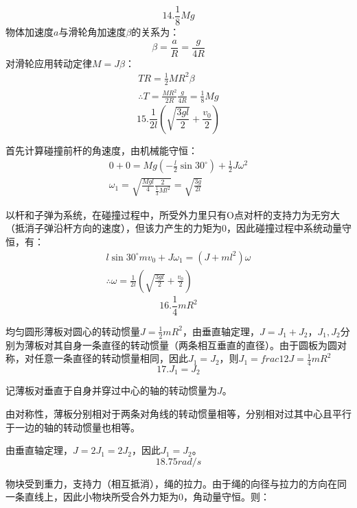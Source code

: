 \documentclass[b5paper,opensource]{./template/qyxf-book}
\begin{document}
		\[14.\frac{1}{8}Mg\]
		物体加速度$ a $与滑轮角加速度$ \beta $的关系为：
		\[\beta=\frac{a}{R}=\frac{g}{4R}\]
		对滑轮应用转动定律$M=J\beta$：
		\begin{gather*}
		TR=\frac{1}{2}MR^2\beta\\
		\therefore T=\frac{MR^2}{2R}\frac{g}{4R}=\frac{1}{8}Mg
		\end{gather*}
		\[15.\frac{1}{2l}\left(\sqrt{\frac{3gl}{2}}+\frac{v_0}{2}\right)\]\par
		首先计算碰撞前杆的角速度，由机械能守恒：
		\begin{gather*}
		0+0=Mg(-\frac{l}{2}\sin 30^\circ)+\frac{1}{2}J\omega^2\\
		\omega_1=\sqrt{\frac{Mgl}{4}\frac{2}{\frac{1}{3}Ml^2}}=\sqrt{\frac{3g}{2l}}
		\end{gather*}\par
		以杆和子弹为系统，在碰撞过程中，所受外力里只有O点对杆的支持力为无穷大（抵消子弹沿杆方向的速度），但该力产生的力矩为0，因此碰撞过程中系统动量守恒，有：
		\begin{gather*}
		l\sin 30^\circ mv_0+J\omega_1=(J+ml^2)\omega\\
		\therefore \omega=\frac{1}{2l}\left(\sqrt{\frac{3gl}{2}}+\frac{v_0}{2}\right)
		\end{gather*}
		\[16.\frac{1}{4}mR^2 \]\par		
		均匀圆形薄板对圆心的转动惯量$ J=\frac{1}{2}mR^2 $，由垂直轴定理，$ J=J_1+J_2 $，$ J_1,J_2 $分别为薄板对其自身一条直径的转动惯量（两条相互垂直的直径）。由于圆板为圆对称，对任意一条直径的转动惯量相同，因此$ J_1=J_2 $，则$ J_1=frac{1}{2}J=\frac{1}{4}mR^2 $
		\[17.J_1=J_2\]\par
		记薄板对垂直于自身并穿过中心的轴的转动惯量为$ J $。\par
		由对称性，薄板分别相对于两条对角线的转动惯量相等，分别相对过其中心且平行于一边的轴的转动惯量也相等。\par
		\par
		由垂直轴定理，$ J=2J_1=2J_2 $，因此$ J_1=J_2 $。
		\[18.75rad/s\]\par
		物块受到重力，支持力（相互抵消），绳的拉力。由于绳的向径与拉力的方向在同一条直线上，因此小物块所受合外力矩为0，角动量守恒。则：
\end{document}

